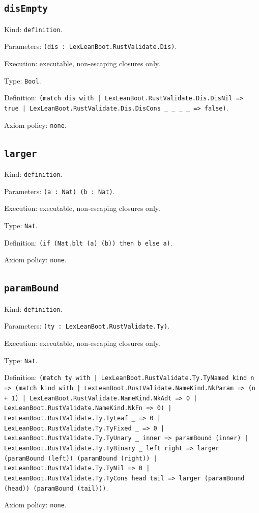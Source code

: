 \documentclass[11pt]{article}
\begin{document}
\subsection*{\texttt{disEmpty}}
\noindent Kind: \texttt{definition}.\par
\noindent Parameters: \texttt{(dis : LexLeanBoot.RustValidate.Dis)}.\par
\noindent Execution: executable, non-escaping closures only.\par
\noindent Type: \texttt{Bool}.\par
\noindent Definition: \texttt{(match dis with | LexLeanBoot.RustValidate.Dis.DisNil => true | LexLeanBoot.RustValidate.Dis.DisCons \_ \_ \_ \_ => false)}.\par
\noindent Axiom policy: \texttt{none}.\par
\subsection*{\texttt{larger}}
\noindent Kind: \texttt{definition}.\par
\noindent Parameters: \texttt{(a : Nat) (b : Nat)}.\par
\noindent Execution: executable, non-escaping closures only.\par
\noindent Type: \texttt{Nat}.\par
\noindent Definition: \texttt{(if (Nat.blt (a) (b)) then b else a)}.\par
\noindent Axiom policy: \texttt{none}.\par
\subsection*{\texttt{paramBound}}
\noindent Kind: \texttt{definition}.\par
\noindent Parameters: \texttt{(ty : LexLeanBoot.RustValidate.Ty)}.\par
\noindent Execution: executable, non-escaping closures only.\par
\noindent Type: \texttt{Nat}.\par
\noindent Definition: \texttt{(match ty with | LexLeanBoot.RustValidate.Ty.TyNamed kind n => (match kind with | LexLeanBoot.RustValidate.NameKind.NkParam => (n + 1) | LexLeanBoot.RustValidate.NameKind.NkAdt => 0 | LexLeanBoot.RustValidate.NameKind.NkFn => 0) | LexLeanBoot.RustValidate.Ty.TyLeaf \_ => 0 | LexLeanBoot.RustValidate.Ty.TyFixed \_ => 0 | LexLeanBoot.RustValidate.Ty.TyUnary \_ inner => paramBound (inner) | LexLeanBoot.RustValidate.Ty.TyBinary \_ left right => larger (paramBound (left)) (paramBound (right)) | LexLeanBoot.RustValidate.Ty.TyNil => 0 | LexLeanBoot.RustValidate.Ty.TyCons head tail => larger (paramBound (head)) (paramBound (tail)))}.\par
\noindent Axiom policy: \texttt{none}.\par
\end{document}
